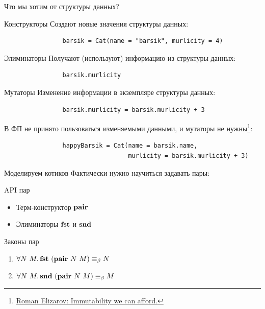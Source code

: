     \begin{frame}[fragile]{Что мы хотим от структуры данных?}
        \pause
        \vspace{-0.5em}
        \begin{block}{Конструкторы}
            Создают новые значения структуры данных:
            \begin{verbatim}
                barsik = Cat(name = "barsik", murlicity = 4)
            \end{verbatim}
        \end{block}
        \pause
        \begin{block}{Элиминаторы}
            Получают (используют) информацию из структуры данных:
            \begin{verbatim}
                barsik.murlicity
            \end{verbatim}
        \end{block}
        \pause
        \begin{block}{Мутаторы}
            Изменение информации в экземпляре структуры данных:
            \begin{verbatim}
                barsik.murlicity = barsik.murlicity + 3
            \end{verbatim}
            \pause
            В ФП не принято пользоваться изменяемыми данными, и мутаторы не нужны\footnote{\href{https://elizarov.medium.com/immutability-we-can-afford-10c0dcb8351d}{\color{blue} Roman Elizarov: Immutability we can afford.}}:
            \begin{verbatim}
                happyBarsik = Cat(name = barsik.name,
                                  murlicity = barsik.murlicity + 3)
            \end{verbatim}
        \end{block}
    \end{frame}

    \begin{frame}[fragile]{Моделируем котиков}
        \pause
        Фактически нужно научиться задавать пары:
        \begin{block}{API пар}
            \begin{itemize}
                \item Терм-конструктор $\mathbf{pair}$
                \item Элиминаторы $\mathbf{fst}$ и $\mathbf{snd}$
            \end{itemize}
        \end{block}
        \pause
        \begin{block}{Законы пар}
            \begin{enumerate}
                \item $\forall N~M\ldotp \mathbf{fst}~(\mathbf{pair}~N~M) \equiv_\beta N$
                \item $\forall N~M\ldotp \mathbf{snd}~(\mathbf{pair}~N~M) \equiv_\beta M$
            \end{enumerate}
        \end{block}
    \end{frame}

